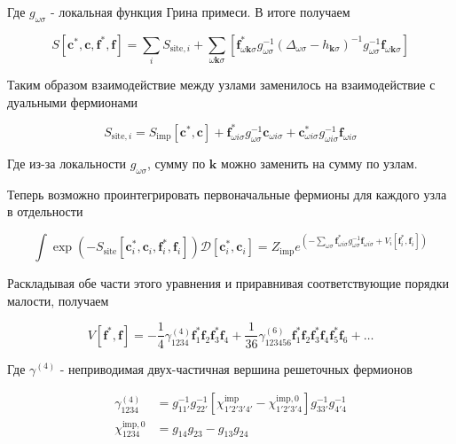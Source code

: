 \documentclass[11pt,a4paper]{report}
\begin{document}
Где $g_{\omega\sigma}$ - локальная функция Грина примеси. В итоге получаем

\begin{equation}
 S[\mathbf{c}^*,\mathbf{c},\mathbf{f}^*,\mathbf{f}] = \sum_i S_{\text{site},i} + \sum_{\omega\mathbf{k}\sigma}
 \left[\mathbf{f}^*_{\omega\mathbf{k}\sigma} g_{\omega\sigma}^{-1}(\Delta_{\omega\sigma}-h_{\mathbf{k}\sigma})^{-1} g_{\omega\sigma}^{-1}\mathbf{f}_{\omega\mathbf{k}\sigma}\right]
\end{equation}

Таким образом взаимодействие между узлами заменилось на взаимодействие с дуальными фермионами

\begin{equation}
 S_{\text{site},i} = S_{\text{imp}}[\mathbf{c}^*,\mathbf{c}] + \mathbf{f}^*_{\omega i\sigma} g_{\omega\sigma}^{-1}\mathbf{c}_{\omega i\sigma} + \mathbf{c}^*_{\omega i\sigma} g_{\omega i\sigma}^{-1}\mathbf{f}_{\omega i\sigma}
\end{equation}

Где из-за локальности $g_{\omega\sigma}$, сумму по $\mathbf{k}$ можно заменить на сумму по узлам.

Теперь возможно проинтегрировать первоначальные фермионы для каждого узла в отдельности

\begin{equation}
 \int \exp{(-S_{\text{site}}[\mathbf{c}^*_i,\mathbf{c}_i,\mathbf{f}^*_i,\mathbf{f}_i])}\mathcal{D}[\mathbf{c}^*_i,\mathbf{c}_i] = Z_{\text{imp}} e^{(-\sum_{\omega\sigma}\mathbf{f}^*_{\omega i\sigma}g_{\omega\sigma}^{-1}\mathbf{f}_{\omega i\sigma}+V_i[\mathbf{f}^*_i,\mathbf{f}_i])}
\end{equation}

Раскладывая обе части этого уравнения и приравнивая соответствующие порядки малости, получаем

\begin{equation}
 V[\mathbf{f}^*,\mathbf{f}] = -\frac{1}{4} \gamma_{1234}^{(4)}\mathbf{f}^*_{1}\mathbf{f}_{2}\mathbf{f}^*_{3}\mathbf{f}_{4} + 
 \frac{1}{36} \gamma_{123456}^{(6)}\mathbf{f}^*_{1}\mathbf{f}_{2}\mathbf{f}^*_{3}\mathbf{f}_{4}\mathbf{f}^*_{5}\mathbf{f}_{6} + \dots
\end{equation}

Где $\gamma^{(4)}$ - неприводимая двух-частичная вершина решеточных фермионов

\begin{equation}
\begin{split}
 \gamma_{1234}^{(4)} &= g_{11'}^{-1}g_{22'}^{-1}\left[\chi_{1'2'3'4'}^{\text{imp}}-\chi_{1'2'3'4}^{\text{imp},0}\right]g_{33'}^{-1}g_{4'4}^{-1} \\
 \chi_{1234}^{\text{imp},0} &= g_{14}g_{23} - g_{13}g_{24}
\end{split}
\end{equation}
\end{document}

